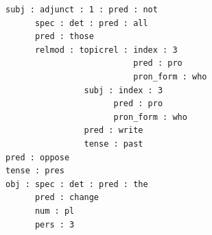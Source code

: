 \documentclass[output=paper,hidelinks]{langscibook}
\begin{document}
%    
%

\largerpage
\ea
\label{resultingfstruc}
{\begin{footnotesize}
\begin{verbatim}
subj : adjunct : 1 : pred : not
      spec : det : pred : all
      pred : those
      relmod : topicrel : index : 3
                          pred : pro
                          pron_form : who
                subj : index : 3
                      pred : pro
                      pron_form : who
                pred : write
                tense : past
pred : oppose
tense : pres
obj : spec : det : pred : the
      pred : change
      num : pl
      pers : 3
    \end{verbatim}
    \end{footnotesize}}
\z
\end{document}

